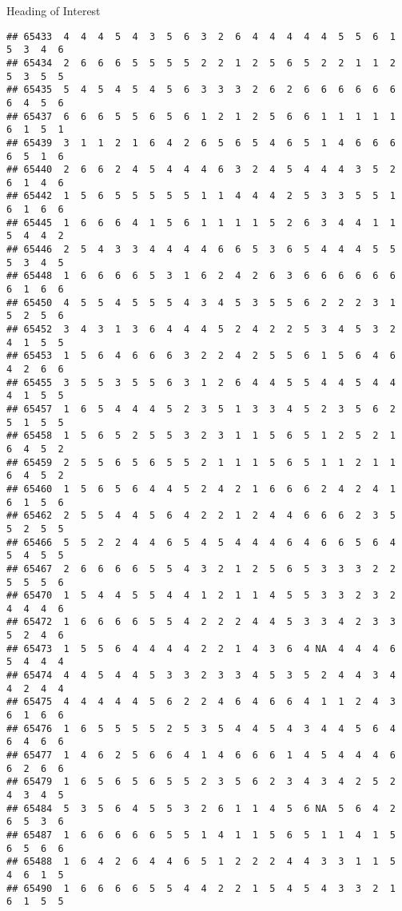\documentclass[
  ignorenonframetext,
]{beamer}
\begin{document}
\begin{frame}[fragile]{Heading of Interest}
\begin{verbatim}
## 65433  4  4  4  5  4  3  5  6  3  2  6  4  4  4  4  4  5  5  6  1  5  3  4  6
## 65434  2  6  6  6  5  5  5  5  2  2  1  2  5  6  5  2  2  1  1  2  5  3  5  5
## 65435  5  4  5  4  5  4  5  6  3  3  3  2  6  2  6  6  6  6  6  6  6  4  5  6
## 65437  6  6  6  5  5  6  5  6  1  2  1  2  5  6  6  1  1  1  1  1  6  1  5  1
## 65439  3  1  1  2  1  6  4  2  6  5  6  5  4  6  5  1  4  6  6  6  6  5  1  6
## 65440  2  6  6  2  4  5  4  4  4  6  3  2  4  5  4  4  4  3  5  2  6  1  4  6
## 65442  1  5  6  5  5  5  5  5  1  1  4  4  4  2  5  3  3  5  5  1  6  1  6  6
## 65445  1  6  6  6  4  1  5  6  1  1  1  1  5  2  6  3  4  4  1  1  5  4  4  2
## 65446  2  5  4  3  3  4  4  4  4  6  6  5  3  6  5  4  4  4  5  5  5  3  4  5
## 65448  1  6  6  6  6  5  3  1  6  2  4  2  6  3  6  6  6  6  6  6  6  1  6  6
## 65450  4  5  5  4  5  5  5  4  3  4  5  3  5  5  6  2  2  2  3  1  5  2  5  6
## 65452  3  4  3  1  3  6  4  4  4  5  2  4  2  2  5  3  4  5  3  2  4  1  5  5
## 65453  1  5  6  4  6  6  6  3  2  2  4  2  5  5  6  1  5  6  4  6  4  2  6  6
## 65455  3  5  5  3  5  5  6  3  1  2  6  4  4  5  5  4  4  5  4  4  4  1  5  5
## 65457  1  6  5  4  4  4  5  2  3  5  1  3  3  4  5  2  3  5  6  2  5  1  5  5
## 65458  1  5  6  5  2  5  5  3  2  3  1  1  5  6  5  1  2  5  2  1  6  4  5  2
## 65459  2  5  5  6  5  6  5  5  2  1  1  1  5  6  5  1  1  2  1  1  6  4  5  2
## 65460  1  5  6  5  6  4  4  5  2  4  2  1  6  6  6  2  4  2  4  1  6  1  5  6
## 65462  2  5  5  4  4  5  6  4  2  2  1  2  4  4  6  6  6  2  3  5  5  2  5  5
## 65466  5  5  2  2  4  4  6  5  4  5  4  4  4  6  4  6  6  5  6  4  5  4  5  5
## 65467  2  6  6  6  6  5  5  4  3  2  1  2  5  6  5  3  3  3  2  2  5  5  5  6
## 65470  1  5  4  4  5  5  4  4  1  2  1  1  4  5  5  3  3  2  3  2  4  4  4  6
## 65472  1  6  6  6  6  5  5  4  2  2  2  4  4  5  3  3  4  2  3  3  5  2  4  6
## 65473  1  5  5  6  4  4  4  4  2  2  1  4  3  6  4 NA  4  4  4  6  5  4  4  4
## 65474  4  4  5  4  4  5  3  3  2  3  3  4  5  3  5  2  4  4  3  4  4  2  4  4
## 65475  4  4  4  4  4  5  6  2  2  4  6  4  6  6  4  1  1  2  4  3  6  1  6  6
## 65476  1  6  5  5  5  5  2  5  3  5  4  4  5  4  3  4  4  5  6  4  6  4  6  6
## 65477  1  4  6  2  5  6  6  4  1  4  6  6  6  1  4  5  4  4  4  6  6  2  6  6
## 65479  1  6  5  6  5  6  5  5  2  3  5  6  2  3  4  3  4  2  5  2  4  3  4  5
## 65484  5  3  5  6  4  5  5  3  2  6  1  1  4  5  6 NA  5  6  4  2  6  5  3  6
## 65487  1  6  6  6  6  6  5  5  1  4  1  1  5  6  5  1  1  4  1  5  6  5  6  6
## 65488  1  6  4  2  6  4  4  6  5  1  2  2  2  4  4  3  3  1  1  5  4  6  1  5
## 65490  1  6  6  6  6  5  5  4  4  2  2  1  5  4  5  4  3  3  2  1  6  1  5  5

\end{verbatim}
\end{frame}
\end{document}
